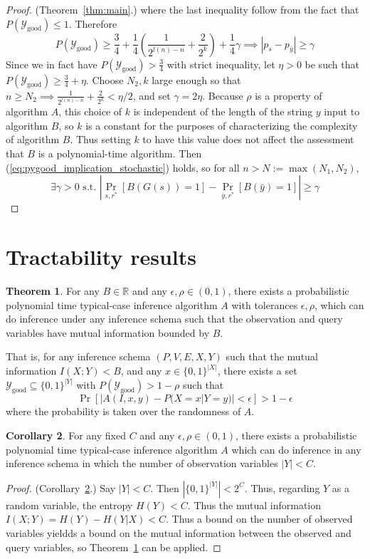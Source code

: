 \documentclass{article}
\def \Ygood{\mathcal{Y}_\text{good}}
\def \by{{\bar{y}}}
\theoremstyle{definition}
\newtheorem{thm}{Theorem}
\newtheorem{cor}[thm]{Corollary}
\theoremstyle{remark}
\begin{document}
\begin{proof}{(Theorem~\ref{thm:main}.)}
where the last inequality follow from the fact that $P(\Ygood) \leq 1$.
Therefore
\begin{equation} \label{eq:pygood_implication_stochastic}
P(\Ygood) \geq \frac{3}{4} + \frac{1}{4}(\frac{1}{2^{l(n) - n}} + \frac{2}{2^k}) + \frac{1}{4} \gamma \implies |p_s - p_\by| \geq \gamma
\end{equation}
Since we in fact have $P(\Ygood) > \frac{3}{4}$ with strict inequality, let $\eta > 0$ be such that $P(\Ygood) \geq \frac{3}{4} + \eta$.
Choose $N_2, k$ large enough so that $n \geq N_2 \implies \frac{1}{2^{l(n) - n}} + \frac{2}{2^k} < \eta/2$, and set $\gamma = 2\eta$.
Because $\rho$ is a property of algorithm $A$, this choice of $k$ is independent of the length of the string $y$ input to algorithm $B$, so $k$ is a constant for the purposes of characterizing the complexity of algorithm $B$.
Thus setting $k$ to have this value does not affect the assessment that $B$ is a polynomial-time algorithm.
Then (\ref{eq:pygood_implication_stochastic}) holds, so for all $n > N := \max(N_1, N_2)$,
$$
\exists \gamma > 0 \text{ s.t. } |\Pr_{s, r^*}[B(G(s)) = 1] - \Pr_{\by, r^*}[B(\by) = 1]| \geq \gamma
$$

\end{proof}

\section{Tractability results}
\begin{thm} \label{thm:bounded_mutual_info}
For any $B \in \mathbb{R}$ and any $\epsilon, \rho \in (0, 1)$,
there exists a probabilistic polynomial time typical-case inference algorithm $A$
with tolerances $\epsilon, \rho$, which can do inference under any inference schema such that the observation and query variables have mutual information bounded by $B$.

\smallskip
\noindent That is, for any
inference schema $(P, V, E, X, Y)$ such that the mutual information $I(X; Y) < B$, and any $x \in \{0, 1\}^{|X|}$, there exists a set $\Ygood \subseteq \{0, 1\}^{|Y|}$ with $P(\Ygood) > 1 - \rho$ such that
$$
\Pr[|A(I, x, y) - P(X = x | Y = y)| < \epsilon] > 1 - \epsilon
$$
where the probability is taken over the randomness of $A$.
\end{thm}
\begin{cor} \label{cor:small_obs_set}
For any fixed $C$ and any $\epsilon, \rho \in (0, 1)$,
there exists a probabilistic polynomial time typical-case inference algorithm $A$
which can do inference in any inference schema in which the number of observation variables $|Y| < C$.
\end{cor}
\begin{proof}{(Corollary~\ref{cor:small_obs_set}.)}
Say $|Y| < C$.  Then $|\{{0, 1}\}^{|Y|}| < 2^C$.
Thus, regarding $Y$ as a random variable, the entropy $H(Y) < C$.
Thus the mutual information $I(X ; Y) = H(Y) - H(Y | X) < C$.
Thus a bound on the number of observed variables yieldds a bound on the mutual information between the observed and query variables, so Theorem~\ref{thm:bounded_mutual_info} can be applied.
\end{proof}
\end{document}
